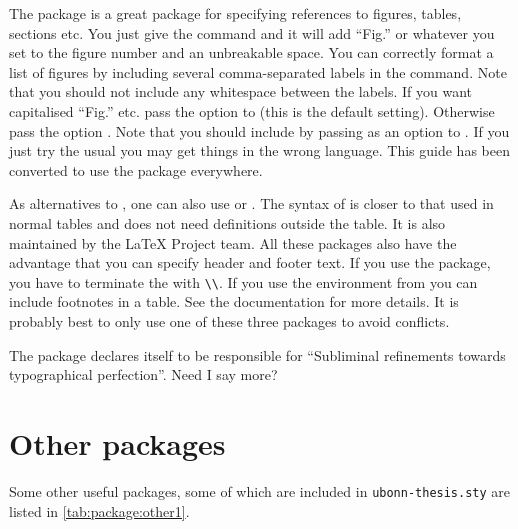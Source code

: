 The  package is a great package for specifying references to
figures, tables, sections etc.
You just give the command  and it will add \enquote{Fig.} or whatever
you set to the figure number and an unbreakable space.
You can correctly format a list of figures by including several comma-separated labels in the  command.
Note that you should not include any whitespace between the labels.
If you want capitalised \enquote{Fig.} etc. pass the option 
to  (this is the default setting).
Otherwise pass the option .
Note that you should include  by passing  
as an option to .
If you just try the usual  you may get things in the wrong language.
This guide has been converted to use the  package everywhere.

As alternatives to , one can also use
 or . 
The syntax of  is closer to that used in normal tables
and does not need definitions outside the table.
It is also maintained by the \LaTeX{} Project team.
All these packages also have the advantage that you
can specify header and footer text.
If you use the  package,
you have to terminate the  with \verb|\\|.
If you use the  environment from  
you can include footnotes in a table.
See the  documentation for more details.
It is probably best to only use one of these three packages to avoid conflicts.

The package  declares itself to be responsible for
\enquote{Subliminal refinements towards typographical perfection}.
Need I say more?

\section{Other packages}%
\label{sec:package:other}

Some other useful packages, some of which are included in
\texttt{ubonn-thesis.sty} are listed in
\cref{tab:package:other1}.

